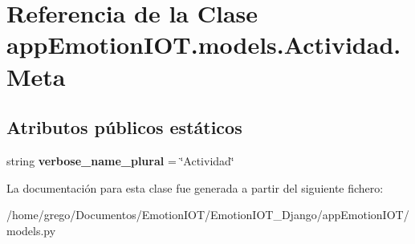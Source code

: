 \hypertarget{classappEmotionIOT_1_1models_1_1Actividad_1_1Meta}{}\section{Referencia de la Clase app\+Emotion\+I\+O\+T.\+models.\+Actividad.\+Meta}
\label{classappEmotionIOT_1_1models_1_1Actividad_1_1Meta}
\subsection*{Atributos públicos estáticos}
\begin{DoxyCompactItemize}
\item 
string {\bfseries verbose\+\_\+name\+\_\+plural} = \char`\"{}Actividad\char`\"{}\hypertarget{classappEmotionIOT_1_1models_1_1Actividad_1_1Meta_a1d4152a398694b23948ef540683398d7}{}\label{classappEmotionIOT_1_1models_1_1Actividad_1_1Meta_a1d4152a398694b23948ef540683398d7}

\end{DoxyCompactItemize}


La documentación para esta clase fue generada a partir del siguiente fichero\+:\begin{DoxyCompactItemize}
\item 
/home/grego/\+Documentos/\+Emotion\+I\+O\+T/\+Emotion\+I\+O\+T\+\_\+\+Django/app\+Emotion\+I\+O\+T/models.\+py\end{DoxyCompactItemize}
